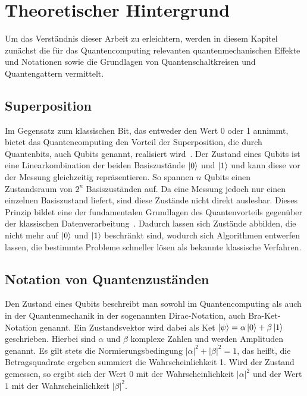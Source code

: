 \chapter{Theoretischer Hintergrund}
\label{chap:hintergrund}
Um das Verständnis dieser Arbeit zu erleichtern, werden in diesem Kapitel zunächst die für das Quantencomputing relevanten quantenmechanischen Effekte und Notationen sowie die Grundlagen von Quantenschaltkreisen und Quantengattern vermittelt.

\section{Superposition}
\label{sec:superposition}
Im Gegensatz zum klassischen Bit, das entweder den Wert 0 oder 1 annimmt, bietet das Quantencomputing den Vorteil der Superposition, die durch
Quantenbits, auch Qubits genannt, realisiert wird~\cite{nielsen2010chuang}. Der Zustand eines Qubits ist eine Linearkombination der beiden Basiszustände $\ket{0}$ und
$\ket{1}$ und kann diese vor der Messung gleichzeitig repräsentieren. So spannen $n$ Qubits einen Zustandsraum von $2^n$ Basiszuständen auf. Da eine Messung jedoch nur einen einzelnen Basiszustand liefert, sind diese Zustände nicht direkt auslesbar. Dieses Prinzip bildet eine der fundamentalen Grundlagen des Quantenvorteils gegenüber der klassischen
Datenverarbeitung~\cite{preskill2018quantum}. Dadurch lassen sich Zustände abbilden, die nicht mehr auf $\ket{0}$ und $\ket{1}$ beschränkt sind, wodurch sich Algorithmen entwerfen lassen, die bestimmte Probleme schneller lösen als bekannte klassische Verfahren.
\newpage
\section{Notation von Quantenzuständen}
\label{sec:braket}
Den Zustand eines Qubits beschreibt man sowohl im Quantencomputing als auch in der Quantenmechanik in der sogenannten Dirac-Notation, auch Bra-Ket-Notation genannt. Ein Zustandsvektor wird dabei als Ket $\ket{\psi} = \alpha\ket{0} + \beta\ket{1}$ geschrieben. Hierbei sind $\alpha$ und $\beta$ komplexe Zahlen und werden Amplituden genannt. Es gilt stets die Normierungsbedingung $|\alpha|^2 + |\beta|^2 = 1$, das heißt, die Betragsquadrate ergeben summiert die Wahrscheinlichkeit 1. Wird der Zustand gemessen, so ergibt sich der Wert $0$ mit der Wahrscheinlichkeit $|\alpha|^2$ und der Wert $1$ mit der Wahrscheinlichkeit $|\beta|^2$.
